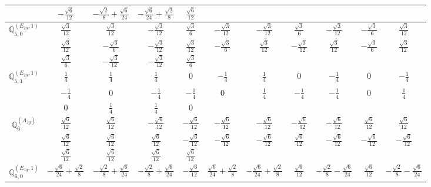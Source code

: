 \documentclass[fleqn,10pt,landscape]{article}
\begin{document}
\begin{itemize}
{\begin{center}
\begin{longtable}{ccccccccccc}
& $ - \frac{\sqrt{6}}{12} $ & $ - \frac{\sqrt{2}}{8} + \frac{\sqrt{6}}{24} $ & $ - \frac{\sqrt{6}}{24} + \frac{\sqrt{2}}{8} $ & $ \frac{\sqrt{6}}{12} $ & $  $ & $  $ & $  $ & $  $ & $  $ & $  $ \\ \hline
$\mathbb{Q}_{5,0}^{(E_{2u},1)}$ & $ \frac{\sqrt{3}}{12} $ & $ \frac{\sqrt{3}}{12} $ & $ - \frac{\sqrt{3}}{12} $ & $ \frac{\sqrt{3}}{6} $ & $ - \frac{\sqrt{3}}{12} $ & $ - \frac{\sqrt{3}}{12} $ & $ \frac{\sqrt{3}}{6} $ & $ - \frac{\sqrt{3}}{12} $ & $ - \frac{\sqrt{3}}{6} $ & $ \frac{\sqrt{3}}{12} $ \\
& $ \frac{\sqrt{3}}{12} $ & $ - \frac{\sqrt{3}}{6} $ & $ - \frac{\sqrt{3}}{12} $ & $ \frac{\sqrt{3}}{12} $ & $ - \frac{\sqrt{3}}{6} $ & $ \frac{\sqrt{3}}{12} $ & $ - \frac{\sqrt{3}}{12} $ & $ \frac{\sqrt{3}}{12} $ & $ - \frac{\sqrt{3}}{6} $ & $ \frac{\sqrt{3}}{12} $ \\
& $ \frac{\sqrt{3}}{6} $ & $ - \frac{\sqrt{3}}{12} $ & $ - \frac{\sqrt{3}}{12} $ & $ \frac{\sqrt{3}}{6} $ & $  $ & $  $ & $  $ & $  $ & $  $ & $  $ \\ \hline
$\mathbb{Q}_{5,1}^{(E_{2u},1)}$ & $ \frac{1}{4} $ & $ \frac{1}{4} $ & $ \frac{1}{4} $ & $ 0 $ & $ - \frac{1}{4} $ & $ \frac{1}{4} $ & $ 0 $ & $ - \frac{1}{4} $ & $ 0 $ & $ - \frac{1}{4} $ \\
& $ - \frac{1}{4} $ & $ 0 $ & $ - \frac{1}{4} $ & $ - \frac{1}{4} $ & $ 0 $ & $ \frac{1}{4} $ & $ - \frac{1}{4} $ & $ - \frac{1}{4} $ & $ 0 $ & $ \frac{1}{4} $ \\
& $ 0 $ & $ \frac{1}{4} $ & $ \frac{1}{4} $ & $ 0 $ & $  $ & $  $ & $  $ & $  $ & $  $ & $  $ \\ \hline
$\mathbb{Q}_{6}^{(A_{2g})}$ & $ \frac{\sqrt{6}}{12} $ & $ \frac{\sqrt{6}}{12} $ & $ - \frac{\sqrt{6}}{12} $ & $ - \frac{\sqrt{6}}{12} $ & $ - \frac{\sqrt{6}}{12} $ & $ - \frac{\sqrt{6}}{12} $ & $ - \frac{\sqrt{6}}{12} $ & $ - \frac{\sqrt{6}}{12} $ & $ \frac{\sqrt{6}}{12} $ & $ \frac{\sqrt{6}}{12} $ \\
& $ \frac{\sqrt{6}}{12} $ & $ \frac{\sqrt{6}}{12} $ & $ \frac{\sqrt{6}}{12} $ & $ - \frac{\sqrt{6}}{12} $ & $ - \frac{\sqrt{6}}{12} $ & $ - \frac{\sqrt{6}}{12} $ & $ \frac{\sqrt{6}}{12} $ & $ - \frac{\sqrt{6}}{12} $ & $ - \frac{\sqrt{6}}{12} $ & $ - \frac{\sqrt{6}}{12} $ \\
& $ \frac{\sqrt{6}}{12} $ & $ \frac{\sqrt{6}}{12} $ & $ \frac{\sqrt{6}}{12} $ & $ \frac{\sqrt{6}}{12} $ & $  $ & $  $ & $  $ & $  $ & $  $ & $  $ \\ \hline
$\mathbb{Q}_{6,0}^{(E_{1g},1)}$ & $ - \frac{\sqrt{6}}{24} + \frac{\sqrt{2}}{8} $ & $ - \frac{\sqrt{2}}{8} + \frac{\sqrt{6}}{24} $ & $ - \frac{\sqrt{2}}{8} + \frac{\sqrt{6}}{24} $ & $ - \frac{\sqrt{6}}{12} $ & $ \frac{\sqrt{6}}{24} + \frac{\sqrt{2}}{8} $ & $ - \frac{\sqrt{6}}{24} + \frac{\sqrt{2}}{8} $ & $ \frac{\sqrt{6}}{12} $ & $ - \frac{\sqrt{2}}{8} - \frac{\sqrt{6}}{24} $ & $ \frac{\sqrt{6}}{12} $ & $ - \frac{\sqrt{2}}{8} - \frac{\sqrt{6}}{24} $ \\

\end{longtable}
\end{center}}
\end{itemize}
\end{document}
